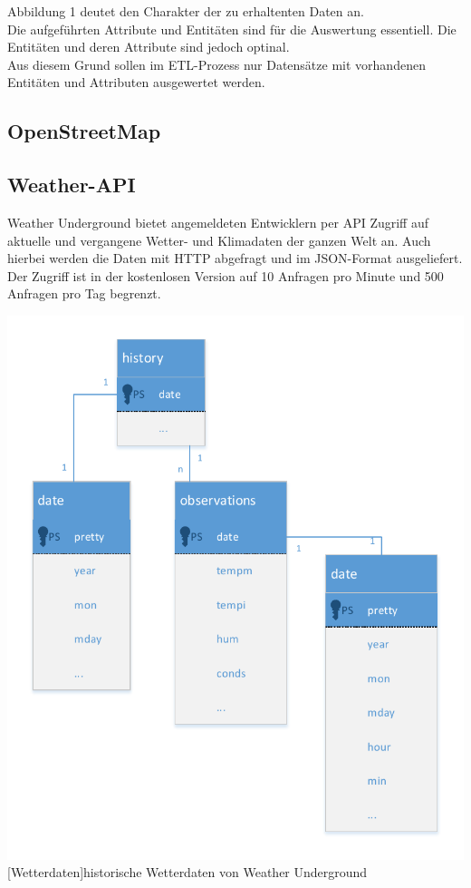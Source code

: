 \documentclass[a4paper,12pt]{scrartcl}
\makeatletter
\def\ScaleIfNeeded{%
\ifdim\Gin@nat@width>\linewidth
\linewidth
\else
\Gin@nat@width
\fi
}
\makeatother
\begin{document}
Abbildung 1 deutet den Charakter der zu erhaltenten Daten an.\\
Die aufgeführten Attribute und Entitäten sind für die Auswertung essentiell. Die Entitäten und deren Attribute sind jedoch optinal.\\
Aus diesem Grund sollen im ETL-Prozess nur Datensätze mit vorhandenen Entitäten und Attributen ausgewertet werden.


\subsection{OpenStreetMap}




\subsection{Weather-API}

Weather Underground bietet angemeldeten Entwicklern per API Zugriff auf aktuelle und vergangene Wetter- und Klimadaten der ganzen Welt an. Auch hierbei werden die Daten mit HTTP abgefragt und im JSON-Format ausgeliefert.\\
Der Zugriff ist in der kostenlosen Version auf 10 Anfragen pro Minute und 500 Anfragen pro Tag begrenzt.

\begin{center}
\centering
\includegraphics[width=\ScaleIfNeeded]{../Weather.pdf}%
[Wetterdaten]{historische Wetterdaten von Weather Underground}%
\end{center}
\end{document}
